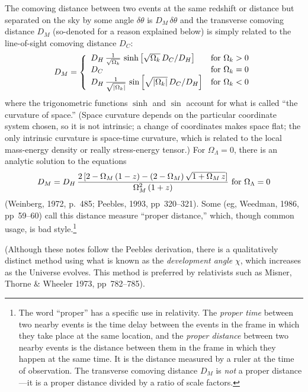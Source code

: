 The comoving distance between two events at the same redshift or
distance but separated on the sky by some angle $\delta\theta$ is
$D_M\,\delta\theta$ and the transverse comoving distance $D_M$
(so-denoted for a reason explained below) is simply related to the
line-of-sight comoving distance $D_C$:
\begin{equation}
D_M = \left\{
\begin{array}{ll}
D_H\,\frac{1}{\sqrt{\Omega_k}}\,\sinh\left[\sqrt{\Omega_k}\,D_C/D_H\right] & {\rm for}~\Omega_k>0 \\
D_C & {\rm for}~\Omega_k=0 \\
D_H\,\frac{1}{\sqrt{|\Omega_k|}}\,\sin\left[\sqrt{|\Omega_k|}\,D_C/D_H\right] & {\rm for}~\Omega_k<0
\end{array}
\right.
\end{equation}
where the trigonometric functions $\sinh$ and $\sin$ account for what
is called ``the curvature of space.''  (Space curvature depends on the
particular coordinate system chosen, so it is not intrinsic; a change
of coordinates makes space flat; the only intrinsic curvature is
space-time curvature, which is related to the local mass-energy
density or really stress-energy tensor.)  For $\Omega_{\Lambda}=0$,
there is an analytic solution to the equations
\begin{equation}
D_M=D_H\,\frac{2\,[2-\Omega_M\,(1-z)-
(2-\Omega_M)\,\sqrt{1+\Omega_M\,z}]}{\Omega_M^2\,(1+z)}
~{\rm for}~\Omega_{\Lambda}=0
\end{equation}
(Weinberg, 1972, p.~485; Peebles, 1993, pp~320--321).  Some (eg,
Weedman, 1986, pp~59--60) call this distance measure ``proper
distance,'' which, though common usage, is bad style.\footnote{The
word ``proper'' has a specific use in relativity.  The {\em proper
time\/} between two nearby events is the time delay between the events
in the frame in which they take place at the same location, and the
{\em proper distance\/} between two nearby events is the distance
between them in the frame in which they happen at the same time.  It
is the distance measured by a ruler at the time of observation.  The
transverse comoving distance $D_M$ is {\em not\/} a proper
distance---it is a proper distance divided by a ratio of scale
factors.}

(Although these notes follow the Peebles derivation, there is a
qualitatively distinct method using what is known as the {\em
development angle\/} $\chi$, which increases as the Universe evolves.
This method is preferred by relativists such as Misner, Thorne \&
Wheeler 1973, pp~782--785).

